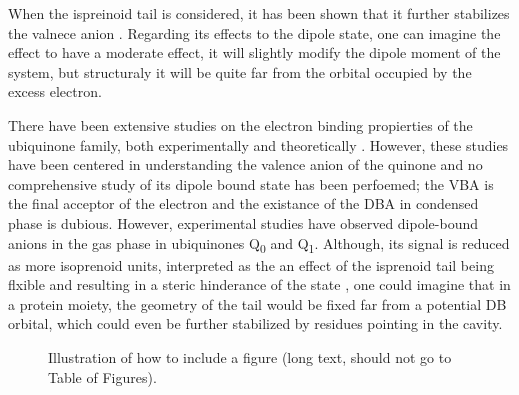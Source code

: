 When the ispreinoid tail is considered, it has been shown that it further stabilizes the valnece anion \cite{pshenichnyuk2020ionizing}. Regarding its effects to the dipole state, one can imagine the effect to have a moderate effect, it will slightly modify the dipole moment of the system, but structuraly it will be quite far from the orbital occupied by the excess electron.

There have been extensive studies on the electron binding propierties of the ubiquinone family, both experimentally \cite{ameixa2023parent,west2014anion,pshenichnyuk2020ionizing,bull2015anion} and theoretically \cite{ameixa2023parent,pshenichnyuk2020ionizing,haldar2020multilayer, nonella1998quantum}. However, these studies have been centered in understanding the valence anion of the quinone and no comprehensive study of its dipole bound state has been perfoemed; the VBA is the final acceptor of the electron and the existance of the DBA in condensed phase is dubious.
However, experimental studies have observed dipole-bound anions in the gas phase in ubiquinones Q\textsubscript{0} and Q\textsubscript{1}\cite{ameixa2023parent}. Although, its signal is reduced as more isoprenoid units, interpreted as the an effect of the isprenoid tail being flxible and resulting in a steric hinderance of the state \cite{ameixa2023parent,pshenichnyuk2020ionizing}, one could imagine that in a protein moiety, the geometry of the tail would be fixed far from a potential DB orbital, which could even be further stabilized by residues pointing in the cavity.

\begin{figure}[th!]
  \centering
  
  \caption[Short caption for Table of Figures]{Illustration of how to
  include a figure (long text, should not go to Table of Figures).}
  \label{fig:test}
\end{figure}

\cleardoublepage

